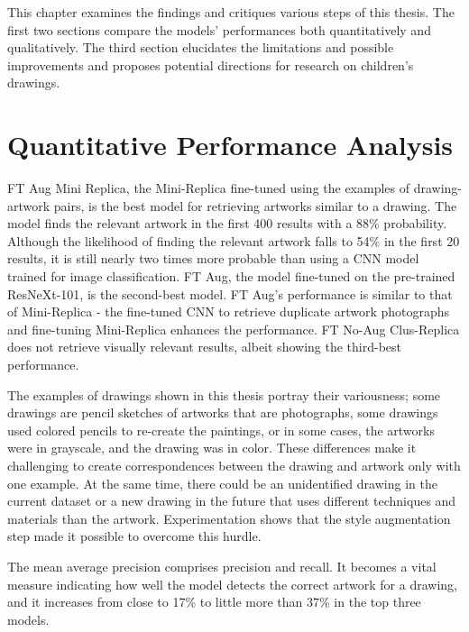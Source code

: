 This chapter examines the findings and critiques various steps of this thesis. The first two sections compare the models' performances both quantitatively and qualitatively. The third section elucidates the limitations and possible improvements and proposes potential directions for research on children's drawings.

\section{Quantitative Performance Analysis}

FT Aug Mini Replica, the Mini-Replica fine-tuned using the examples of drawing-artwork pairs, is the best model for retrieving artworks similar to a drawing. The model finds the relevant artwork in the first 400 results with a 88\% probability. Although the likelihood of finding the relevant artwork falls to 54\% in the first 20 results, it is still nearly two times more probable than using a CNN model trained for image classification. FT Aug, the model fine-tuned on the pre-trained ResNeXt-101, is the second-best model. FT Aug's performance is similar to that of Mini-Replica - the fine-tuned CNN to retrieve duplicate artwork photographs and fine-tuning Mini-Replica enhances the performance. FT No-Aug Clus-Replica does not retrieve visually relevant results, albeit showing the third-best performance.

The examples of drawings shown in this thesis portray their variousness; some drawings are pencil sketches of artworks that are photographs, some drawings used colored pencils to re-create the paintings, or in some cases, the artworks were in grayscale, and the drawing was in color. These differences make it challenging to create correspondences between the drawing and artwork only with one example. At the same time, there could be an unidentified drawing in the current dataset or a new drawing in the future that uses different techniques and materials than the artwork. Experimentation shows that the style augmentation step made it possible to overcome this hurdle.

The mean average precision comprises precision and recall. It becomes a vital measure indicating how well the model detects the correct artwork for a drawing, and it increases from close to 17\% to little more than 37\% in the top three models. 

